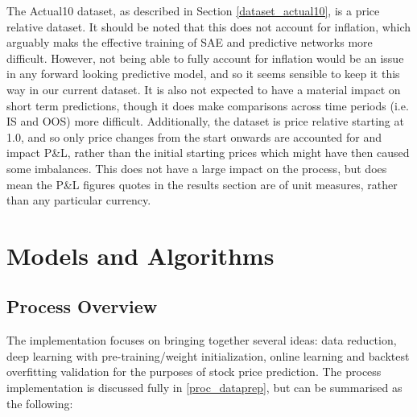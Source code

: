 \documentclass[a4paper,11pt,oneside]{article}
\theoremstyle{plain}
\theoremstyle{definition}
\begin{document}
	The Actual10 dataset, as described in Section \ref{dataset_actual10}, is a price relative dataset. It should be noted that this does not account for inflation, which arguably maks the effective training of SAE and predictive networks more difficult. However, not being able to fully account for inflation would be an issue in any forward looking predictive model, and so it seems sensible to keep it this way in our current dataset. It is also not expected to have a material impact on short term predictions, though it does make comparisons across time periods (i.e. IS and OOS) more difficult. Additionally, the dataset is price relative starting at 1.0, and so only price changes from the start onwards are accounted for and impact P\&L, rather than the initial starting prices which might have then caused some imbalances. This does not have a large impact on the process, but does mean the P\&L figures quotes in the results section are of unit measures, rather than any particular currency.
	
	\newpage
	\section{Models and Algorithms}\label{Implementation}
	\subsection{Process Overview}\label{ProcessOverview}\label{imp_overview}
	
	
	The implementation focuses on bringing together several ideas: data reduction, deep learning with pre-training/weight initialization, online learning and backtest overfitting validation for the purposes of stock price prediction. The process implementation is discussed fully in \ref{proc_dataprep}, but can be summarised as the following:
	
\end{document}
